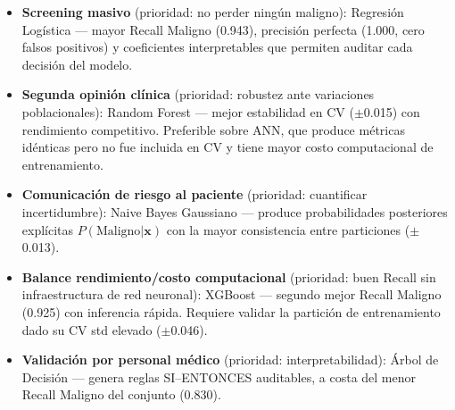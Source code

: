 \documentclass[journal]{IEEEtran}
\begin{document}
\begin{itemize}
  \item \textbf{Screening masivo} (prioridad: no perder
  ningún maligno): Regresión Logística — mayor Recall
  Maligno (0.943), precisión perfecta (1.000, cero falsos
  positivos) y coeficientes interpretables que permiten
  auditar cada decisión del modelo.

  \item \textbf{Segunda opinión clínica} (prioridad:
  robustez ante variaciones poblacionales): Random Forest
  — mejor estabilidad en CV ($\pm$0.015) con rendimiento
  competitivo. Preferible sobre ANN, que produce métricas
  idénticas pero no fue incluida en CV y tiene mayor costo
  computacional de entrenamiento.

  \item \textbf{Comunicación de riesgo al paciente}
  (prioridad: cuantificar incertidumbre): Naive Bayes
  Gaussiano — produce probabilidades posteriores explícitas
  $P(\text{Maligno}|\mathbf{x})$ con la mayor consistencia
  entre particiones ($\pm$0.013).

  \item \textbf{Balance rendimiento/costo computacional}
  (prioridad: buen Recall sin infraestructura de red neuronal):
  XGBoost — segundo mejor Recall Maligno (0.925) con
  inferencia rápida. Requiere validar la partición de
  entrenamiento dado su CV std elevado ($\pm$0.046).

  \item \textbf{Validación por personal médico}
  (prioridad: interpretabilidad): Árbol de Decisión —
  genera reglas SI–ENTONCES auditables, a costa del menor
  Recall Maligno del conjunto (0.830).
\end{itemize}
\end{document}
